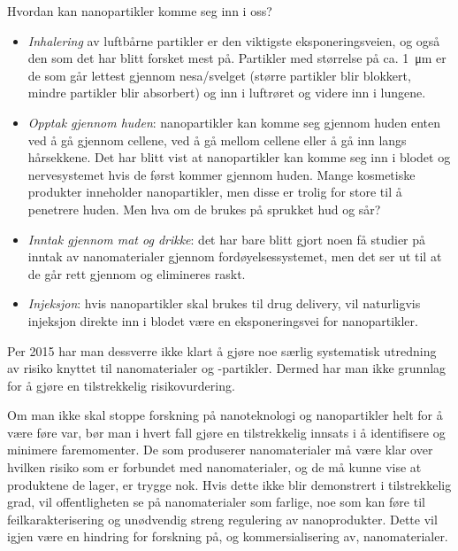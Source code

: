 \vfill
\columnbreak

Hvordan kan nanopartikler komme seg inn i oss?
\begin{itemize}
	\item \emph{Inhalering} av luftbårne partikler er den viktigste eksponeringsveien, og også den som det har blitt forsket mest på. Partikler med størrelse på ca. \SI{1}{\micro\meter} er de som går lettest gjennom nesa/svelget (større partikler blir blokkert, mindre partikler blir absorbert) og inn i luftrøret og videre inn i lungene.
	\item \emph{Opptak gjennom huden}: nanopartikler kan komme seg gjennom huden enten ved å gå gjennom cellene, ved å gå mellom cellene eller å gå inn langs hårsekkene. Det har blitt vist at nanopartikler kan komme seg inn i blodet og nervesystemet hvis de først kommer gjennom huden. Mange kosmetiske produkter inneholder nanopartikler, men disse er trolig for store til å penetrere huden. Men hva om de brukes på sprukket hud og sår?
	\item \emph{Inntak gjennom mat og drikke}: det har bare blitt gjort noen få studier på inntak av nanomaterialer gjennom fordøyelsessystemet, men det ser ut til at de går rett gjennom og elimineres raskt.
	\item \emph{Injeksjon}: hvis nanopartikler skal brukes til drug delivery, vil naturligvis injeksjon direkte inn i blodet være en eksponeringsvei for nanopartikler.
\end{itemize}

Per 2015 har man dessverre ikke klart å gjøre noe særlig systematisk utredning av risiko knyttet til nanomaterialer og -partikler. Dermed har man ikke grunnlag for å gjøre en tilstrekkelig risikovurdering. 

Om man ikke skal stoppe forskning på nanoteknologi og nanopartikler helt for å være føre var, bør man i hvert fall gjøre en tilstrekkelig innsats i å identifisere og minimere faremomenter. De som produserer nanomaterialer må være klar over hvilken risiko som er forbundet med nanomaterialer, og de må kunne vise at produktene de lager, er trygge nok. Hvis dette ikke blir demonstrert i tilstrekkelig grad, vil offentligheten se på nanomaterialer som farlige, noe som kan føre til feilkarakterisering og unødvendig streng regulering av nanoprodukter. Dette vil igjen være en hindring for forskning på, og kommersialisering av, nanomaterialer.